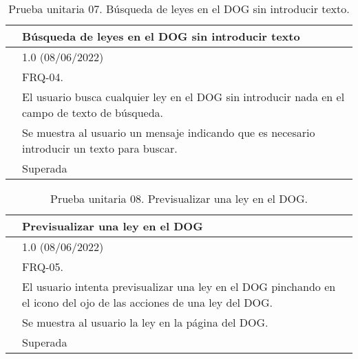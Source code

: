 \begin{table}[H]
\begin{center}
\begin{tabular}{|p{3cm}|p{10cm}|} \hline
\centering {\bf PU-07} & Búsqueda de leyes en el DOG sin introducir texto  \\ \hline\hline
\centering {\bf Versión} & 1.0 (08/06/2022) \\ \hline
\centering {\bf Dependencias} & FRQ-04. \\ \hline
\centering {\bf Descripción} &  El usuario busca cualquier ley en el DOG sin introducir nada en el campo de texto de búsqueda. \\ \hline
\centering {\bf Criterio de aceptación} & Se muestra al usuario un mensaje indicando que es necesario introducir un texto para buscar. \\ \hline
\centering {\bf Estado} & Superada \\ \hline
\end{tabular}
\caption{Prueba unitaria 07. Búsqueda de leyes en el DOG sin introducir texto.}
\label{enlacePU7}
\end{center}
\end{table}

\begin{table}[H]
\begin{center}
\begin{tabular}{|p{3cm}|p{10cm}|} \hline
\centering {\bf PU-08} & Previsualizar una ley en el DOG  \\ \hline\hline
\centering {\bf Versión} & 1.0 (08/06/2022) \\ \hline
\centering {\bf Dependencias} & FRQ-05. \\ \hline
\centering {\bf Descripción} &  El usuario intenta previsualizar una ley en el DOG pinchando en el icono del ojo de las acciones de una ley del DOG. \\ \hline
\centering {\bf Criterio de aceptación} & Se muestra al usuario la ley en la página del DOG. \\ \hline
\centering {\bf Estado} & Superada \\ \hline
\end{tabular}
\caption{Prueba unitaria 08. Previsualizar una ley en el DOG.}
\label{enlacePU8}
\end{center}
\end{table}

